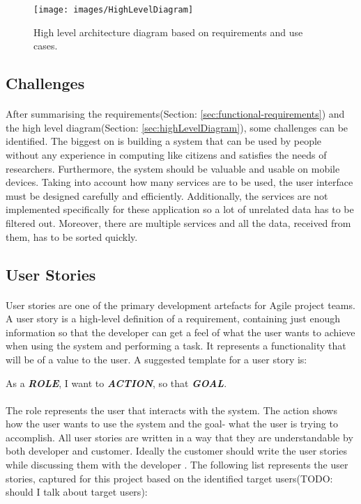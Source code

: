 \documentclass{l4proj}
\begin{document}
\begin{figure}[H]
		\centering
		\texttt{[image: images/HighLevelDiagram]}
		\caption{High level architecture diagram based on requirements and use cases.}
		\label{highLevelDiagram}
\end{figure}

\subsection{Challenges}
\paragraph{}
After summarising the requirements(Section: \ref{sec:functional-requirements}) and the high level diagram(Section: \ref{sec:highLevelDiagram}), some challenges can be identified. The biggest on is building a system that can be used by people without any experience in computing like citizens and satisfies the needs of researchers. Furthermore, the system should be valuable and usable on mobile devices. Taking into account how many services are to be used, the user interface must be designed carefully and efficiently. Additionally, the services are not implemented specifically for these application so a lot of unrelated data has to be filtered out. Moreover, there are multiple services and all the data, received from them, has to be sorted quickly.   

\subsection{User Stories}
\paragraph{}
User stories are one of the primary development artefacts for Agile project teams. A user story is a high-level definition of a requirement, containing just enough information so that the developer can get a feel of what the user wants to achieve when using the system and performing a task. It represents a functionality that will be of a value to the user. A suggested template for a user story is: 

\begin{center}
	As a \textbf{\textit{ROLE}}, I want to \textbf{\textit{ACTION}}, so that \textbf{\textit{GOAL}}. \cite{sets}
\end{center}
\paragraph{}
The role represents the user that interacts with the system. The action shows how the user wants to use the system and the goal- what the user is trying to accomplish. All user stories are written in a way that they are understandable by both developer and customer. Ideally the customer should write the user stories while discussing them with the developer \cite{sets}. The following list represents the user stories, captured for this project based on the identified target users(TODO: should I talk about target users):    
\end{document}
